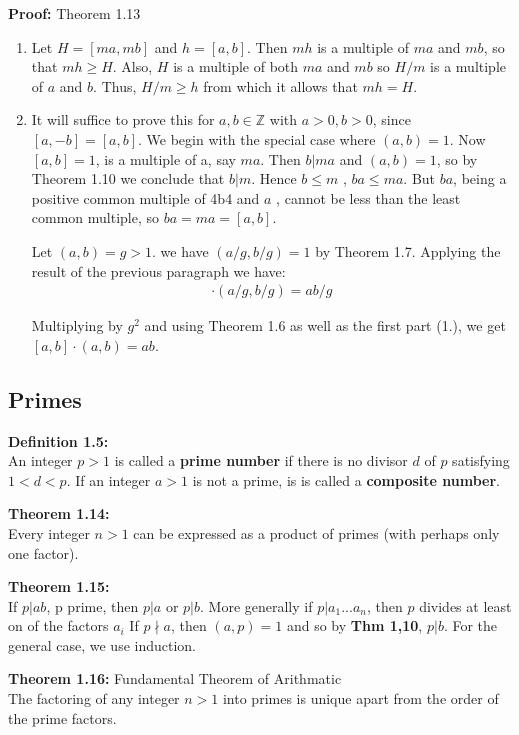 \documentclass[a4paper]{article}
\begin{document}
\textbf{Proof:} Theorem 1.13

\begin{enumerate}
\item Let $H=[ma,mb]$ and $h=[a,b]$. Then $mh$ is a multiple of $ma$ and $mb$, so that $mh\geq H$. Also, $H$ is a multiple of both $ma$ and $mb$ so $H/m$ is a multiple of $a$ and $b$. Thus, $H/m \geq h$ from which it allows that $mh=H$.
\item It will suffice to prove this for $a,b\in\mathbb{Z}$ with $a>0,b>0$, since $[a,-b]=[a,b]$. We begin with the special case where $(a,b)=1$. Now $[a,b]=1$, is a multiple of a, say $ma$. Then $b|ma$ and $(a,b)=1$, so by Theorem 1.10 we conclude that $b|m$. Hence $b \leq m$ , $ba\leq ma$. But $ba$, being a positive common multiple of 4b4 and $a$ , cannot be less than the least common multiple, so $ba=ma=[a,b]$.

Let $(a,b)=g>1$. we have $(a/g,b/g)=1$ by Theorem 1.7. Applying the result of the previous paragraph we have:
\begin{align}
[a/g,b/g]\cdot(a/g,b/g)=ab/g
\end{align}

Multiplying by $g^2$ and using Theorem 1.6 as well as the first part (1.), we get $[a,b]\cdot(a,b)=ab$.
\end{enumerate}


\subsection{Primes}

\textbf{Definition 1.5:}\\
An integer $p>1$ is called a \textbf{prime number} if there is no divisor $d$ of $p$ satisfying $1<d<p$. If an integer $a>1$ is not a prime, is is called a \textbf{composite number}.

\textbf{Theorem 1.14:}\\
Every integer $n>1$ can be expressed as a product of primes (with perhaps only one factor).


\textbf{Theorem 1.15:}\\
If $p|ab$, p prime, then $p|a$ or $p|b$. More generally if $p|a_1...a_n$, then $p$ divides at least on of the factors $a_i$ If $p\nmid a$, then $(a,p)=1$ and so by \textbf{Thm 1,10}, $p|b$. For the general case, we use induction.

\textbf{Theorem 1.16:} Fundamental Theorem of Arithmatic\\
The factoring of any integer $n>1$ into primes is unique apart from the order of the prime factors.
\end{document}
